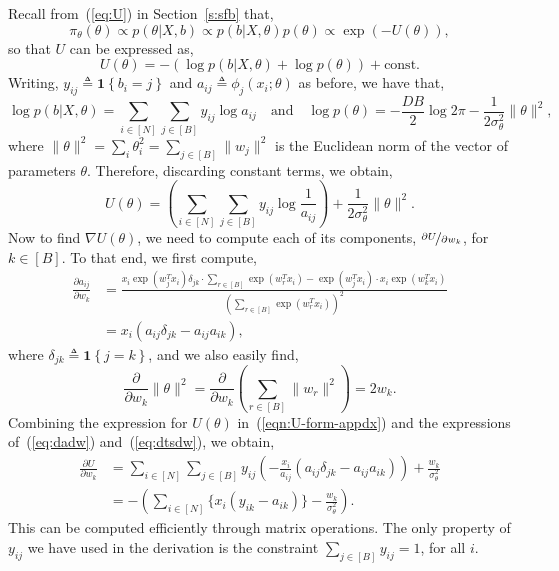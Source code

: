 Recall from~(\ref{eq:U}) in Section~\ref{s:sfb} that,
$$	\pi_\theta(\theta) \propto p(\theta | X, b) \propto p(b | X, \theta) p(\theta) \propto  \exp \left( - U(\theta) \right),
$$ 
so that $U$ can be expressed as,
$$
U(\theta) 
= - \left( \log p(b | X, \theta) + \log p(\theta) \right) + \textrm{const}.
$$
Writing,
$y_{ij} \triangleq \boldsymbol{1} \left\{ b_i = j \right\}$ and 
$a_{ij} \triangleq \phi_j(x_i; \theta)$ as before, we have that,
%
\begin{equation*}
	\log p(b | X, \theta) = \sum_{i \in [N]} \sum_{j \in [B]} y_{ij} \log a_{ij}  \quad \textrm{and} \quad
	\log p(\theta) = -\frac{D B}{2} \log 2\pi - \frac{1}{2 \sigma_\theta^2} 
	\|\theta \|^2,
	\label{eqn:U-constituent-terms}
\end{equation*}
%
where
$\|\theta\|^2 = \sum_{i} \theta_{i}^2 = \sum_{j \in [B]} \|w_j\|^2$ 
is the Euclidean norm of the vector of parameters $\theta$.
Therefore, discarding constant terms, we 
obtain,
%
\begin{equation}
	U(\theta) = \left( \sum_{i \in [N]} \sum_{j \in [B]} y_{ij} \log \frac{1}{a_{ij}} \right)
	+ \frac{1}{2\sigma_\theta^2} \|\theta\|^2.
	\label{eqn:U-form-appdx}
\end{equation}
%
Now to find $\nabla U(\theta)$, we need to compute
each of its components,
$\nicefrac{\partial U}{\partial w_k}$, for $k \in [B]$.
To that end, we first compute,
%
\begin{align}
	\frac{\partial a_{ij}}{\partial w_k} &= \frac
	{x_i \exp(w_j^T x_i) \delta_{jk} \cdot \sum_{r \in [B]} \exp(w_r^T x_i) 
		- 
		\exp(w_j^T x_i) \cdot x_i \exp(w_k^T x_i)}
	{\left( \sum_{r \in [B]} \exp(w_r^T x_i) \right)^2} \nonumber \\
	&= x_i \left( a_{ij} \delta_{jk} - a_{ij}a_{ik} \right), 
	\label{eq:dadw}
\end{align}
%
where $\delta_{jk} \triangleq \boldsymbol{1} \left\{ j = k \right\}$,
and we also easily find,
%
\begin{equation}
	\frac{ \partial}{\partial w_k} \|\theta\|^2 = \frac{\partial}{\partial w_k} \left( \sum_{r \in [B]} \|w_r\|^2 \right) = 2w_k.
	\label{eq:dtsdw}
\end{equation}
%
Combining the expression for $U(\theta)$ in~(\ref{eqn:U-form-appdx}) and the expressions of~(\ref{eq:dadw}) and~(\ref{eq:dtsdw}), we obtain,
\begin{align}
	\frac{\partial U}{\partial w_k} &= 
	\sum_{i \in [N]} \sum_{j \in [B]} y_{ij} 
	\left( -\frac{x_i}{a_{ij}} \left( a_{ij} \delta_{jk} - a_{ij} a_{ik} \right) \right)
	+ \frac{w_k}{\sigma_\theta^2} \nonumber \\
	&= - \left( \sum_{i \in [N]} \Big\{ x_i (y_{ik} - a_{ik}) \Big\} - \frac{w_k}{\sigma_\theta^2} \right).
\end{align}
%
This can be computed 
efficiently through matrix operations. The only property of $y_{ij}$ 
we have used in the derivation is the constraint $\sum_{j \in [B]} y_{ij} = 1$,
for all $i$.

